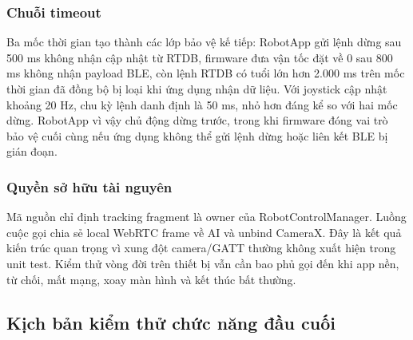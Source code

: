 \subsubsection{Chuỗi timeout}

Ba mốc thời gian tạo thành các lớp bảo vệ kế tiếp: RobotApp gửi lệnh dừng sau 500 ms không nhận cập nhật từ RTDB, firmware đưa vận tốc đặt về 0 sau 800 ms không nhận payload BLE, còn lệnh RTDB có tuổi lớn hơn 2.000 ms trên mốc thời gian đã đồng bộ bị loại khi ứng dụng nhận dữ liệu. Với joystick cập nhật khoảng 20 Hz, chu kỳ lệnh danh định là 50 ms, nhỏ hơn đáng kể so với hai mốc dừng. RobotApp vì vậy chủ động dừng trước, trong khi firmware đóng vai trò bảo vệ cuối cùng nếu ứng dụng không thể gửi lệnh dừng hoặc liên kết BLE bị gián đoạn.

\subsubsection{Quyền sở hữu tài nguyên}

Mã nguồn chỉ định tracking fragment là owner của RobotControlManager. Luồng cuộc gọi chia sẻ local WebRTC frame về AI và unbind CameraX. Đây là kết quả kiến trúc quan trọng vì xung đột camera/GATT thường không xuất hiện trong unit test. Kiểm thử vòng đời trên thiết bị vẫn cần bao phủ gọi đến khi app nền, từ chối, mất mạng, xoay màn hình và kết thúc bất thường.

\subsection{Kịch bản kiểm thử chức năng đầu cuối}

